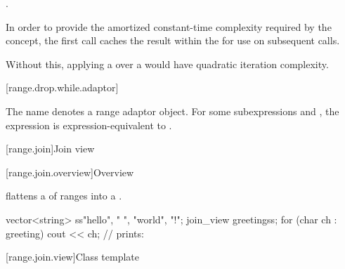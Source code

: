 \begin{itemdescr}
\pnum
\returns
{}.

\pnum
\remarks
In order to provide the amortized constant-time complexity
required by the  concept,
the first call caches the result within the 
for use on subsequent calls.
\begin{note}
Without this,
applying a  over a 
would have quadratic iteration complexity.
\end{note}
\end{itemdescr}

[range.drop.while.adaptor]{}

\pnum
The name 
denotes a range adaptor object.
For some subexpressions  and ,
the expression 
is expression-equivalent to .

[range.join]{Join view}

[range.join.overview]{Overview}

\pnum
{} flattens a  of ranges into a
.

\pnum
\begin{example}
\begin{codeblock}
vector<string> ss{"hello", " ", "world", "!"};
join_view greeting{ss};
for (char ch : greeting)
  cout << ch;                                   // prints: 
\end{codeblock}
\end{example}

[range.join.view]{Class template }

